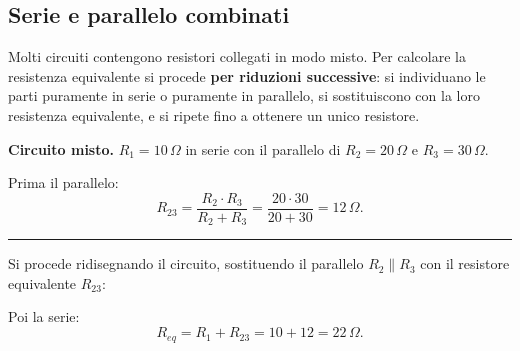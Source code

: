 \subsection{Serie e parallelo combinati}

Molti circuiti contengono resistori collegati in modo misto. Per calcolare la resistenza equivalente si procede \textbf{per riduzioni successive}: si individuano le parti puramente in serie o puramente in parallelo, si sostituiscono con la loro resistenza equivalente, e si ripete fino a ottenere un unico resistore.

\begin{esempio}
\textbf{Circuito misto.} \(R_1 = 10\,\Omega\) in serie con il parallelo di \(R_2 = 20\,\Omega\) e \(R_3 = 30\,\Omega\).

\begin{center}
\end{center}

Prima il parallelo:
\[
R_{23} = \frac{R_2 \cdot R_3}{R_2 + R_3} = \frac{20 \cdot 30}{20 + 30} = 12\,\Omega.
\]

\hrule
\vspace{0.3cm}
Si procede ridisegnando il circuito, sostituendo il parallelo $R_2 \parallel R_3$ con il resistore equivalente $R_{23}$:

\begin{center}
\end{center}

Poi la serie:
\[
R_{eq} = R_1 + R_{23} = 10 + 12 = 22\,\Omega.
\]
\end{esempio}

